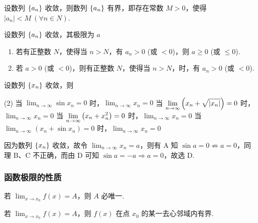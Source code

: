 \begin{theorem}[数列极限的有界性]
    设数列 $\qty{a_n}$ 收敛，则数列 $\qty{a_n}$ 有界，即存在常数 $M>0$，使得 $|a_n|<M~(\forall n\in N)$.
\end{theorem}

\begin{theorem}[数列极限的保号性]
    设数列 $\qty{a_n}$ 收敛，其极限为 $a$
    \begin{enumerate}[label=(\arabic{*})]
        \item 若有正整数 $N$，使得当 $n>N$，有 $a_n>0$ (或 $<0$)，则 $a\geqslant 0$ (或 $\leqslant 0$).
        \item 若 $a>0$ (或 $<0$)，则有正整数 $N$，使得当 $n>N$，时，有 $a_n>0$ (或 $<0$).
    \end{enumerate}
\end{theorem}

\begin{example}[2017 数二]
    设数列 $\qty{x_n}$ 收敛，则 
    \begin{tasks}(2)
        \task 当 $\displaystyle\lim_{n\to\infty}\sin x_n=0$ 时，$\displaystyle\lim_{n\to\infty}x_n=0$
        \task 当 $\displaystyle\lim_{n\to\infty}\qty(x_n+\sqrt{|x_n|})=0$ 时，$\displaystyle\lim_{n\to\infty}x_n=0$
        \task 当 $\displaystyle\lim_{n\to\infty}\qty(x_n+x_n^2)=0$ 时，$\displaystyle\lim_{n\to\infty}x_n=0$
        \task 当 $\displaystyle\lim_{n\to\infty}(x_n+\sin x_n)=0$ 时，$\displaystyle\lim_{n\to\infty}x_n=0$
    \end{tasks}
\end{example}
\begin{solution}
    因为数列 $\qty{x_n}$ 收敛，故令 $\displaystyle\lim_{n\to\infty}x_n=a$，则有 A 知 $\sin a=0\not\Rightarrow a=0$，同理 B、C 不正确，而由 D 可知 $\sin a=-a\Rightarrow a=0$，故选 D.
\end{solution}

\subsubsection{函数极限的性质}

\begin{theorem}[函数极限的唯一性]
    若 $\displaystyle\lim_{x\to x_0}f(x)=A$，则 $A$ 必唯一.
\end{theorem}

\begin{theorem}[函数极限的有界性]
    若 $\displaystyle\lim_{x\to x_0}f(x)=A$，则 $f(x)$ 在点 $x_0$ 的某一去心邻域内有界.
\end{theorem}

